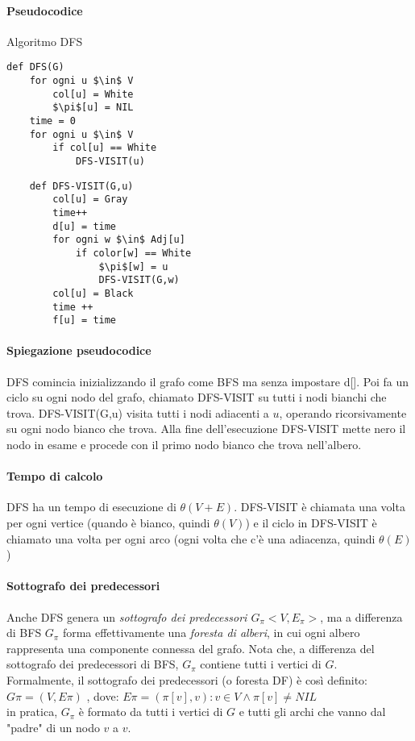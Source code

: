 \documentclass[12pt, a4paper, openany]{book}
\begin{document}
\paragraph{Pseudocodice} Algoritmo DFS
\begin{lstlisting}
def DFS(G)
    for ogni u $\in$ V
        col[u] = White
        $\pi$[u] = NIL
    time = 0
    for ogni u $\in$ V
        if col[u] == White
            DFS-VISIT(u)
\end{lstlisting}
\begin{lstlisting}
	def DFS-VISIT(G,u)
		col[u] = Gray
		time++
		d[u] = time
		for ogni w $\in$ Adj[u]
			if color[w] == White
				$\pi$[w] = u
				DFS-VISIT(G,w)
		col[u] = Black
		time ++
		f[u] = time    
\end{lstlisting}

\paragraph{Spiegazione pseudocodice}
DFS comincia inizializzando il grafo come BFS ma senza impostare d[].
Poi fa un ciclo su ogni nodo del grafo, chiamato DFS-VISIT su tutti i nodi bianchi che trova.
DFS-VISIT(G,u) visita tutti i nodi adiacenti a $u$, operando ricorsivamente su ogni nodo bianco che trova.
Alla fine dell'esecuzione DFS-VISIT mette nero il nodo in esame e procede con il primo nodo bianco che trova nell'albero.
\paragraph*{Tempo di calcolo}
DFS ha un tempo di esecuzione di $\theta(V+E)$.
DFS-VISIT è chiamata una volta per ogni vertice (quando è bianco, quindi $\theta(V)$)
e il ciclo in DFS-VISIT è chiamato una volta per ogni arco (ogni volta che c'è una adiacenza, quindi $\theta(E)$)

\paragraph{Sottografo dei predecessori}
Anche DFS genera un \emph{sottografo dei predecessori $G_\pi<V,E_\pi>$}, ma a differenza di BFS
$G_\pi$ forma effettivamente una \emph{foresta di alberi}, in cui ogni albero rappresenta una componente connessa del grafo.
Nota che, a differenza del sottografo dei predecessori di BFS, $G_\pi$ contiene tutti i vertici di $G$.
\\Formalmente, il sottografo dei predecessori (o foresta DF) è così definito:
$G\pi = (V, E\pi )$ , dove:
$E\pi = {(\pi[v], v) : v \in V \land \pi[v] \neq NIL}$
\\in pratica, $G_\pi$ è formato da tutti i vertici di $G$ e tutti gli archi che vanno dal "padre" di un nodo $v$ a $v$.
\end{document}
